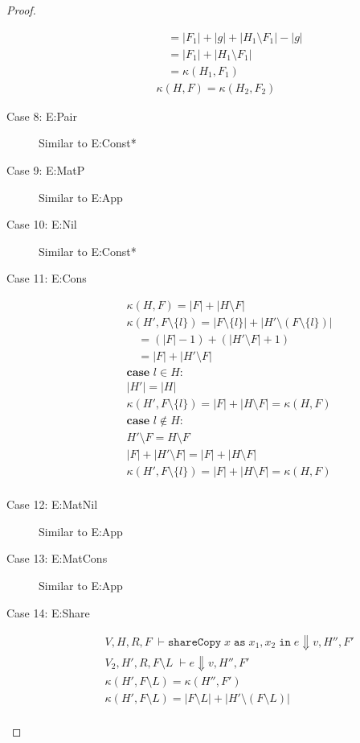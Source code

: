 \documentclass[11pt]{article}
\newcommand{\irl}[1]{\mathtt{#1}}
\newcommand{\sharecpcst}[4]{\irl{shareCopy}\;#1\;\irl{as}\;#2,#3\;\irl{in}\;#4}
\theoremstyle{definition}
\begin{document}
\begin{proof}
\begin{description}
\begin{align*}
	&\quad = |F_1| + |g| + |H_1 \setminus F_1| - | g| \tag{$F \cap g = \emptyset$ and $g \in H_1$}\\
	&\quad = |F_1| + |H_1 \setminus F_1| \\
	&\quad = \kappa(H_1,F_1)\\
	&\kappa(H,F) = \kappa(H_2,F_2)
  \end{align*}
	\item[Case 8: E:Pair]
  Similar to E:Const*
  \item[Case 9: E:MatP]
  Similar to E:App
  \item[Case 10: E:Nil]
  Similar to E:Const*
  \item[Case 11: E:Cons]
  \begin{align*}
	&\kappa(H,F) = |F| + |H \setminus F| \tag{Def. compute potential}\\
	&\kappa(H', F \setminus \{l\}) = |F \setminus \{l\}| + |H' \setminus (F \setminus \{l\})|
				\tag{Def. compute potential}\\
	&\quad = (|F| - 1) + (|H' \setminus F| + 1)\\
	&\quad = |F| + |H' \setminus F|\\
	&\textbf{case } l \in H: \\
	&|H'| = |H| \tag{Def. replacement}\\
	&\kappa(H',F \setminus \{l\}) = |F| + |H \setminus F| = \kappa(H,F)\\
	&\textbf{case } l \notin H: \\
	&H' \setminus F = H \setminus F \tag{$l \notin H$ and $l \in F$}\\
	&|F| + |H' \setminus F| = |F| + |H \setminus F|\\
	&\kappa(H',F \setminus \{l\}) = |F| + |H \setminus F| = \kappa(H,F)\\
  \end{align*}
  \item[Case 12: E:MatNil]
  Similar to E:App
  \item[Case 13: E:MatCons]
	Similar to E:App
  \item[Case 14: E:Share]
	\begin{align*}
		&V,H,R,F \; \vdash \sharecpcst{x}{x_1}{x_2}{e} \Downarrow v,H'',F' \tag{case}\\
 		&V_2,H',R,F \setminus L \; \vdash e \Downarrow v,H'',F' \tag{case}\\
		&\kappa(H',F \setminus L) = \kappa(H'',F') \tag{IH}\\
		&\kappa(H',F \setminus L) = |F \setminus L| + |H' \setminus (F \setminus L)| \tag{Def. compute potential}\\

\end{align*}
\end{description}
\end{proof}
\end{document}
